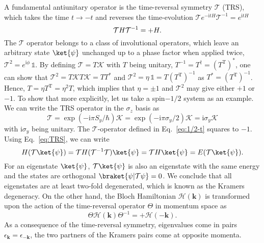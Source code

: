 A fundamental antiunitary operator is the time-reversal symmetry $\mathcal{T}$ (TRS), which takes the time $t \rightarrow -t$ and reverses the time-evolution $\mathcal{T} e^{-\mathrm{i} t H} \mathcal{T}^{-1} = e^{\mathrm{i} t H}$
\begin{equation}
 \hspace*{0.5cm}  \mathcal{T}  H \mathcal{T}^{-1} = + H.
\label{eq:TRS}
\end{equation}
The $\mathcal{T}$ operator belongs to a class of involutional operators, which leave an arbitrary state $\ket{\psi}$ unchanged up to a phase factor when applied twice, $\mathcal{T}^2 = e^{\mathrm{i} \phi} \, \mathbb{1} $. By defining $\mathcal{T} = T \mathcal{K}$ with $T$ being unitary, $T^{-1} = T^{\dagger} = (T^{\mathrm{T}})^*$, one can show that $\mathcal{T}^2 = T \mathcal{K} T \mathcal{K} = T T^*$ and $\mathcal{T}^2 = \eta \, \mathbb{1} = T (T^{\mathrm{T}})^{-1}$ as $T^* = (T^{\mathrm{T}})^{-1}$. Hence, $T= \eta T^{\mathrm{T}} = \eta^2 T$, which implies that $\eta = \pm 1$ and $\mathcal{T}^2 $ may give either $+1$ or $-1$. To show that more explicitly, let us take a spin$-1/2$ system as an example. We can write the TRS operator in the $\sigma_z$ basis as
\begin{equation}
\mathcal{T}= \exp (- \mathrm{i} \pi S_y / \hbar )  \mathcal{K} = \exp (- \mathrm{i} \pi \sigma_y / 2 ) \mathcal{K} = \mathrm{i} \sigma_y \mathcal{K}
\label{eq:1/2-t}
\end{equation}
with $\mathrm{i} \sigma_y$ being unitary. The $\mathcal{T}$-operator defined in Eq.~\eqref{eq:1/2-t} squares to $-1$. Using Eq.~\eqref{eq:TRS}, we can write
\begin{equation}
H (\mathcal{T} \ket{\psi}) = \mathcal{T} H ( \mathcal{T}^{-1} \mathcal{T}) \ket{\psi} = \mathcal{T} H \ket{\psi} = E ( \mathcal{T} \ket{\psi}).
\end{equation}
For an eigenstate $\ket{\psi}$, $\mathcal{T} \ket{\psi}$ is also an eigenstate with the same energy and the states are orthogonal $\braket{\psi | \mathcal{T} \psi} =0$. We conclude that all eigenstates are at least two-fold degenerated, which is known as the Kramers degeneracy. 
On the other hand, the Bloch Hamiltonian $\mathcal{H}( \mathbf{k})$ is transformed upon the action of the time-reversal operator $\Theta$ in momentum space as
\begin{equation}
\Theta  \mathcal{H} (\mathbf{k})  \Theta^{-1} = + \mathcal{H} (- \mathbf{k}).
\label{eq:TRS-k}
\end{equation}
As a consequence of the time-reversal symmetry, eigenvalues come in pairs $\epsilon_{\mathbf{k}} = \epsilon_{-{\mathbf{k}}}$, \ie the two partners of the Kramers pairs come at opposite momenta.

